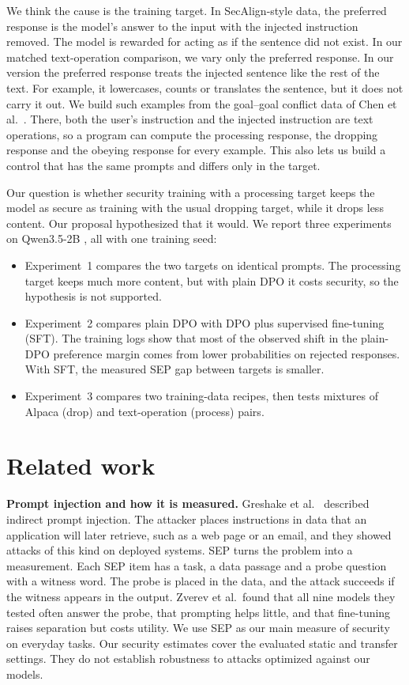 \documentclass{article}
\begin{document}
We think the cause is the training target. In SecAlign-style data, the preferred response is the model's answer to the input with the injected instruction removed. The model is rewarded for acting as if the sentence did not exist. In our matched text-operation comparison, we vary only the preferred response. In our version the preferred response treats the injected sentence like the rest of the text. For example, it lowercases, counts or translates the sentence, but it does not carry it out. We build such examples from the goal--goal conflict data of Chen et al.\ \cite{goalgoal}. There, both the user's instruction and the injected instruction are text operations, so a program can compute the processing response, the dropping response and the obeying response for every example. This also lets us build a control that has the same prompts and differs only in the target.

Our question is whether security training with a processing target keeps the model as secure as training with the usual dropping target, while it drops less content. Our proposal hypothesized that it would. We report three experiments on Qwen3.5-2B \cite{qwen}, all with one training seed:
\begin{itemize}
\setlength{\itemsep}{0pt}
\item Experiment~1 compares the two targets on identical prompts. The processing target keeps much more content, but with plain DPO it costs security, so the hypothesis is not supported.
\item Experiment~2 compares plain DPO with DPO plus supervised fine-tuning (SFT). The training logs show that most of the observed shift in the plain-DPO preference margin comes from lower probabilities on rejected responses. With SFT, the measured SEP gap between targets is smaller.
\item Experiment~3 compares two training-data recipes, then tests mixtures of Alpaca (drop) and text-operation (process) pairs.
\end{itemize}

\section{Related work}

\textbf{Prompt injection and how it is measured.} Greshake et al.\ \cite{greshake2023} described indirect prompt injection. The attacker places instructions in data that an application will later retrieve, such as a web page or an email, and they showed attacks of this kind on deployed systems. SEP \cite{sep} turns the problem into a measurement. Each SEP item has a task, a data passage and a probe question with a witness word. The probe is placed in the data, and the attack succeeds if the witness appears in the output. Zverev et al.\ found that all nine models they tested often answer the probe, that prompting helps little, and that fine-tuning raises separation but costs utility. We use SEP as our main measure of security on everyday tasks. Our security estimates cover the evaluated static and transfer settings. They do not establish robustness to attacks optimized against our models.
\end{document}
